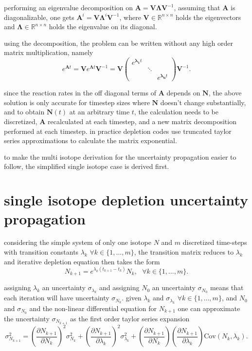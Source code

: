 \documentclass[a4paper]{article}
\begin{document}
performing an eigenvalue decomposition on $\bm{A}=\bm{V}\bm{\Lambda}\bm{V}^{-1}$, assuming that $\bm{A}$ is diagonalizable, one gets $\bm{A}^i=\bm{V}\bm{\Lambda}^i\bm{V}^{-1}$, where $\bm{V}\in\mathbb{R}^{n\times n}$ holds the eigenvectors and $\bm{\Lambda}\in\mathbb{R}^{n\times n}$ holds the eigenvalue on its diagonal.

using the decomposition, the problem can be written without any high order matrix multiplication, namely
\begin{equation}
e^{\bm{A}t}
=\bm{V}e^{\bm{\Lambda}t}\bm{V}^{-1}
=\bm{V}\begin{pmatrix}e^{\bm{\lambda_1}t} &  \\ & \ddots & \\ & & e^{\bm{\lambda_n}t}\end{pmatrix}\bm{V}^{-1}.
\end{equation}

since the reaction rates in the off diagonal terms of $\bm{A}$ depends on $\bm{N}$, the above solution is only accurate for timestep sizes where $\bm{N}$ doesn't change substantially, and to obtain $\bm{N}(t)$ at an arbitrary time $t$, the calculation needs to be discretized, $\bm{A}$ recalculated at each timestep, and a new matrix decomposition performed at each timestep.
in practice depletion codes use truncated taylor series approximations to calculate the matrix exponential.

to make the multi isotope derivation for the uncertainty propagation easier to follow, the simplified single isotope case is derived first.


\section*{single isotope depletion uncertainty propagation}
considering the simple system of only one isotope $N$ and $m$ discretized time-steps with transition constants $\lambda_k$ $\forall k\in\{1,\ldots,m\}$, the transition matrix reduces to $\lambda_k$ and iterative depletion equation then takes the form
\begin{equation}
N_{k+1}=e^{\lambda_k(t_{k+1}-t_k)}N_k, ~~~\forall k\in\{1,\ldots,m\}.
\end{equation}

assigning $\lambda_k$ an uncertainty $\sigma_{\lambda_k}$ and assigning $N_0$ an uncertainty $\sigma_{N_0}$ means that each iteration will have uncertainty $\sigma_{N_k}$.
given $\lambda_k$ and $\sigma_{\lambda_k}$ $\forall k\in\{1,\ldots,m\}$, and $N_0$ and $\sigma_{N_0}$ and the non-linear differential equation for $N_{k+1}$ one can approximate the uncertainty $\sigma_{N_{k+1}}$ as the first order taylor series expansion
\begin{equation}
  \sigma_{N_{k+1}}^2
  =\left(\frac{\partial N_{k+1}}{\partial N_k}\right)^2 \sigma_{N_k}^2
  +\left(\frac{\partial N_{k+1}}{\partial \lambda_k}\right)^2 \sigma_{\lambda_k}^2
  +\left(\frac{\partial N_{k+1}}{\partial N_k}\right)\left(\frac{\partial N_{k+1}}{\partial \lambda_k}\right)\text{Cov}\left(N_k,\lambda_k\right).
\end{equation}
\end{document}

